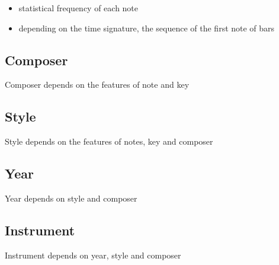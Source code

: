 \documentclass[a4paper,12pt]{article}
\begin{document}
\begin{itemize}
    \item statistical frequency of each note
    \item depending on the time signature, the sequence of the first note of bars
\end{itemize}

\subsection{Composer}

Composer depends on the features of note and key

\subsection{Style}

Style depends on the features of notes, key and composer

\subsection{Year}

Year depends on style and composer

\subsection{Instrument}

Instrument depends on year, style and composer


\end{document}
